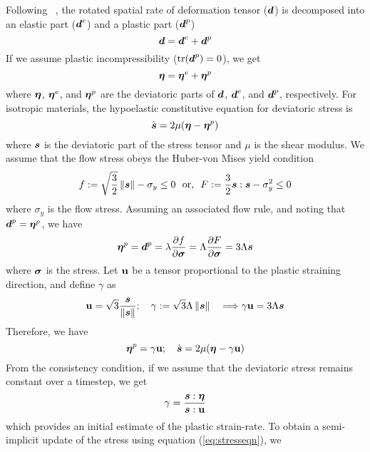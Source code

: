   Following ~\cite{Maudlin96}, the rotated spatial rate of deformation
  tensor ($\Bd$) is decomposed into an elastic part ($\Bd^e$) and a
  plastic part ($\Bd^p$)
  \begin{equation}
     \Bd = \Bd^e + \Bd^p
  \end{equation}
  If we assume plastic incompressibility ($\Tr{(\Bd^p)} = 0$), we get
  \begin{equation}
     \Beta = \Beta^e + \Beta^p
  \end{equation}
  where $\Beta$, $\Beta^e$, and $\Beta^p$ are the deviatoric parts of $\Bd$,
  $\Bd^e$, and $\Bd^p$, respectively.  For isotropic materials, the hypoelastic
  constitutive equation for deviatoric stress is
  \begin{equation}
    \dot{\Bs} = 2\mu(\Beta - \Beta^p)
  \end{equation}
  where $\Bs$ is the deviatoric part of the stress tensor and $\mu$ is the
  shear modulus.  We assume that the flow stress obeys the Huber-von Mises
  yield condition
  \begin{equation}
    f := \sqrt{\frac{3}{2}}\norm{\Bs} - \sigma_y \le 0  ~~\text{or,}~~
    F := \frac{3}{2} \Bs:\Bs - \sigma_y^2 \le 0 
  \end{equation}
  where $\sigma_y$ is the flow stress.  Assuming an associated flow rule,
  and noting that $\Bd^p = \Beta^p$, we have
  \begin{equation}
    \Beta^p = \Bd^p = \lambda\Partial{f}{\Bsig} 
                    = \Lambda\Partial{F}{\Bsig} = 3\Lambda\Bs
  \end{equation}
  where $\Bsig$ is the stress.  Let $\Bu$ be a tensor proportional to the
  plastic straining direction, and define $\gamma$ as
  \begin{equation}
    \Bu = \sqrt{3} \frac{\Bs}{\norm{\Bs}}; \quad
    \gamma := \sqrt{3}\Lambda\norm{\Bs}  \quad \Longrightarrow
    \gamma\Bu = 3\Lambda\Bs
  \end{equation}
  Therefore, we have
  \begin{equation} \label{eq:stresseqn}
    \Beta^p = \gamma\Bu; \quad  
    \dot{\Bs} = 2\mu(\Beta - \gamma\Bu)
  \end{equation}
  From the consistency condition, if we assume that the deviatoric stress
  remains constant over a timestep, we get
  \begin{equation}
    \gamma = \frac{\Bs:\Beta}{\Bs:\Bu}
  \end{equation}
  which provides an initial estimate of the plastic strain-rate.  To obtain
  a semi-implicit update of the stress using equation (\ref{eq:stresseqn}), we
